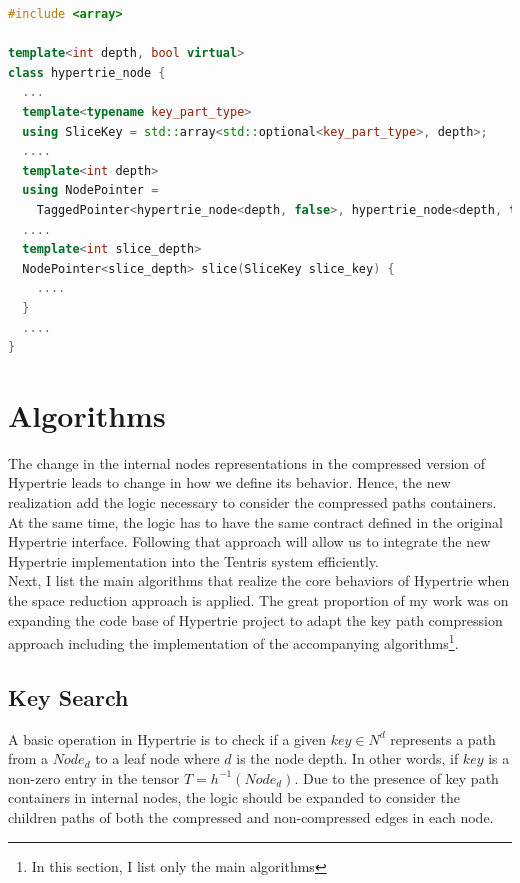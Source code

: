 \begin{lstlisting}[caption={Slicing method signituar defined for node where d = $depth$ in the space-friendly Hypertrie},label={lst:slicing_original_hypertrie},language=C++]
#include <array>

template<int depth, bool virtual>
class hypertrie_node {
  ...
  template<typename key_part_type>
  using SliceKey = std::array<std::optional<key_part_type>, depth>;
  ....
  template<int depth>
  using NodePointer = 
    TaggedPointer<hypertrie_node<depth, false>, hypertrie_node<depth, true>>;
  ....
  template<int slice_depth>
  NodePointer<slice_depth> slice(SliceKey slice_key) {
 	....
  }
  ....
}
\end{lstlisting} 



\section{Algorithms}
The change in the internal nodes representations in the compressed version of Hypertrie leads to change in how we define its behavior. 
Hence, the new realization add the logic necessary to consider the compressed paths containers. 
At the same time, the logic has to have the same contract defined in the original Hypertrie interface. 
Following that approach will allow us to integrate the new Hypertrie implementation into the Tentris system efficiently. \\

Next, I list the main algorithms that realize the core behaviors of Hypertrie when the space reduction approach is applied. The great proportion of my work was on expanding the code base of Hypertrie project to adapt the key path compression approach including the implementation of the accompanying algorithms\footnote{In this section, I list only the main algorithms}.

\subsection{Key Search}
A basic operation in Hypertrie is to check if a given $key \in N^d$ represents a path from a $Node_{d}$ to a leaf node where $d$ is the node depth. In other words, if $key$ is a non-zero entry in the tensor $T = h^{-1} (Node_{d})$. Due to the presence of key path containers in internal nodes, the logic should be expanded to consider the children paths of both the compressed and non-compressed edges in each node. \\

